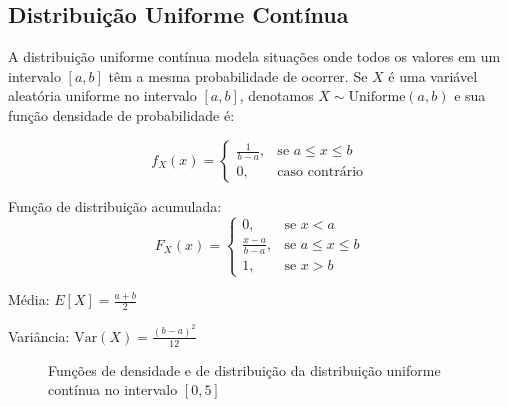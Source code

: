 \documentclass[a4paper,12pt]{article}
\begin{document}
\subsection{Distribuição Uniforme Contínua}

A distribuição uniforme contínua modela situações onde todos os valores em um intervalo $[a,b]$ têm a mesma probabilidade de ocorrer. Se $X$ é uma variável aleatória uniforme no intervalo $[a,b]$, denotamos $X \sim \text{Uniforme}(a,b)$ e sua função densidade de probabilidade é:

\begin{equation}
f_X(x) = 
\begin{cases}
\frac{1}{b-a}, & \text{se } a \leq x \leq b \\
0, & \text{caso contrário}
\end{cases}
\end{equation}

Função de distribuição acumulada:
\begin{equation}
F_X(x) = 
\begin{cases}
0, & \text{se } x < a \\
\frac{x-a}{b-a}, & \text{se } a \leq x \leq b \\
1, & \text{se } x > b
\end{cases}
\end{equation}

Média: $E[X] = \frac{a+b}{2}$

Variância: $\text{Var}(X) = \frac{(b-a)^2}{12}$

\begin{figure}[H]
\centering
{}
\hfill
{}
\caption{Funções de densidade e de distribuição da distribuição uniforme contínua no intervalo $[0,5]$}
\end{figure}
\end{document}
